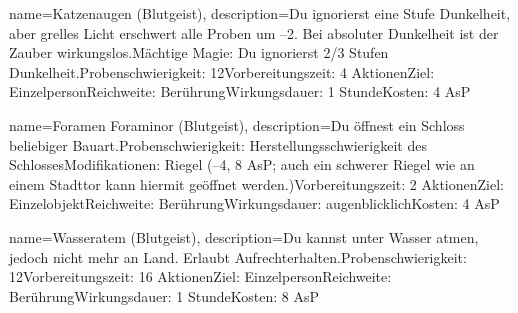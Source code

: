 {
    name={Katzenaugen (Blutgeist)},
    description={Du ignorierst eine Stufe Dunkelheit, aber grelles Licht erschwert alle Proben um –2. Bei absoluter Dunkelheit ist der Zauber wirkungslos.\newline Mächtige Magie: Du ignorierst 2/3 Stufen Dunkelheit.\newline Probenschwierigkeit: 12\newline Vorbereitungszeit: 4 Aktionen\newline Ziel: Einzelperson\newline Reichweite: Berührung\newline Wirkungsdauer: 1 Stunde\newline Kosten: 4 AsP}
}


{
    name={Foramen Foraminor (Blutgeist)},
    description={Du öffnest ein Schloss beliebiger Bauart.\newline Probenschwierigkeit: Herstellungsschwierigkeit des Schlosses\newline Modifikationen: Riegel (–4, 8 AsP; auch ein schwerer Riegel wie an einem Stadttor kann hiermit geöffnet werden.)\newline Vorbereitungszeit: 2 Aktionen\newline Ziel: Einzelobjekt\newline Reichweite: Berührung\newline Wirkungsdauer: augenblicklich\newline Kosten: 4 AsP}
}


{
    name={Wasseratem (Blutgeist)},
    description={Du kannst unter Wasser atmen, jedoch nicht mehr an Land. Erlaubt Aufrechterhalten.\newline Probenschwierigkeit: 12\newline Vorbereitungszeit: 16 Aktionen\newline Ziel: Einzelperson\newline Reichweite: Berührung\newline Wirkungsdauer: 1 Stunde\newline Kosten: 8 AsP}
}


